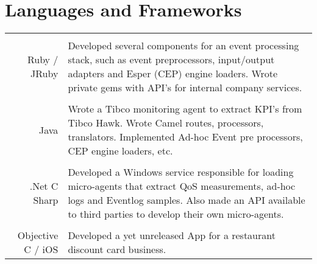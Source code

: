 \documentclass[a4paper,10pt]{article}
\begin{document}
\section{Languages and Frameworks}
\begin{tabular}{r|p{11cm}}
\multicolumn{2}{c}{} \\
	Ruby / JRuby
	& Developed several components for an event processing stack, such as event preprocessors, input/output adapters and Esper (CEP) engine loaders. 
	Wrote private gems with API's for internal company services.\\
\multicolumn{2}{c}{} \\
	Java
	&  Wrote a Tibco monitoring agent to extract KPI's from Tibco Hawk. Wrote Camel routes, processors, translators. Implemented Ad-hoc Event pre processors,
	CEP engine loaders, etc.\\
\multicolumn{2}{c}{} \\
	.Net C Sharp
	&  Developed a Windows service responsible for loading micro-agents that extract QoS measurements, ad-hoc logs and Eventlog samples. 
	Also made an API available to third parties to develop their own micro-agents.\\
\multicolumn{2}{c}{} \\
	Objective C / iOS
	&  Developed a yet unreleased App for a restaurant discount card business.\\
\end{tabular}
\end{document}
